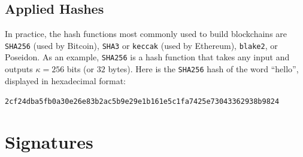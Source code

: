 \subsection*{Applied Hashes}

In practice, the hash functions most commonly used to build blockchains are
\texttt{SHA256} (used by Bitcoin), \texttt{SHA3} or \texttt{keccak} (used by Ethereum),
\texttt{blake2}, or Poseidon. As an example, \texttt{SHA256} is a hash function that takes
any input and outputs $\kappa = 256$ bits (or $32$ bytes). Here is the \texttt{SHA256} hash
of the word ``hello'', displayed in hexadecimal format:

\texttt{2cf24dba5fb0a30e26e83b2ac5b9e29e1b161e5c1fa7425e73043362938b9824}

%
%
%
\section{Signatures}

